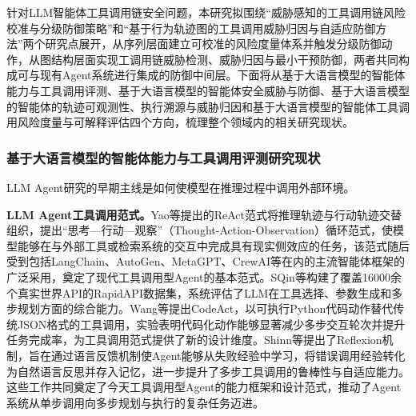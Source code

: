 针对LLM智能体工具调用链安全问题，本研究拟围绕“威胁感知的工具调用链风险校准与分级防御策略”和“基于行为轨迹图的工具调用威胁归因与自适应防御方法”两个研究点展开，从序列层面建立可校准的风险度量体系并触发分级防御动作，从图结构层面实现工调用链威胁检测、威胁归因与最小干预防御，两者共同构成可与现有Agent系统进行集成的防御中间层。下面将从基于大语言模型的智能体能力与工具调用评测、基于大语言模型的智能体安全威胁与防御、基于大语言模型的智能体的轨迹可观测性、执行溯源与威胁归因和基于大语言模型的智能体工具调用风险度量与可解释评估四个方向，梳理整个领域内的相关研究现状。

%

\subsubsection{基于大语言模型的智能体能力与工具调用评测研究现状}

LLM Agent研究的早期主线是如何使模型在推理过程中调用外部环境。

\textbf{LLM Agent工具调用范式。}Yao等\cite{yao2023react}提出的ReAct范式将推理轨迹与行动轨迹交替组织，提出“思考—行动—观察”（Thought-Action-Observation）循环范式，使模型能够在与外部工具或检索系统的交互中完成具有现实侧效应的任务，该范式随后受到包括LangChain、AutoGen、MetaGPT、CrewAI等在内的主流智能体框架的广泛采用，奠定了现代工具调用型Agent的基本范式。SQin等\cite{qin2024toolllm}构建了覆盖16000余个真实世界API的RapidAPI数据集，系统评估了LLM在工具选择、参数生成和多步规划方面的综合能力。Wang等\cite{wang2024codeact}提出CodeAct，以可执行Python代码动作替代传统JSON格式的工具调用，实验表明代码化动作能够显著减少多步交互轮次并提升任务完成率，为工具调用范式提供了新的设计维度。Shinn等\cite{shinn2023reflexion}提出了Reflexion机制，旨在通过语言反馈机制使Agent能够从失败经验中学习，将错误调用经验转化为自然语言反思并存入记忆，进一步提升了多步工具调用的鲁棒性与自适应能力。这些工作共同奠定了今天工具调用型Agent的能力框架和设计范式，推动了Agent系统从单步调用向多步规划与执行的复杂任务迈进。

